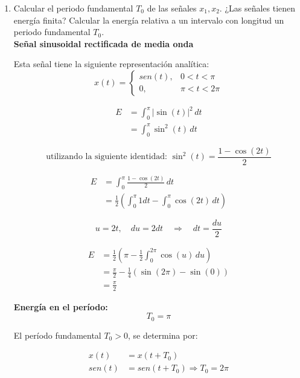 \documentclass[12pt,a4paper]{report}
\begin{document}
\begin{enumerate}[label=\alph*),left=0pt]
  \item Calcular el periodo fundamental $T_0$ de las señales $x_1, x_2$. ¿Las señales tienen energía finita? Calcular
    la energía relativa a un intervalo con longitud un periodo fundamental $T_0$.\\
    \textbf{Señal sinusoidal rectificada de media onda}

    Esta señal tiene la siguiente representación analítica:
    $$x(t)=
    \begin{cases}
      sen(t), & 0<t<\pi\\
      0, & \pi<t<2\pi
    \end{cases}
    $$

    $$
    \begin{aligned}
      E &= \int_{0}^{\pi} |\sin(t)|^2 \, dt \\
        &= \int_{0}^{\pi} \sin^2(t) \, dt
    \end{aligned}
    $$

    $$
    \text{utilizando la siguiente identidad: }
    \sin^2(t) = \frac{1 - \cos(2t)}{2}
    $$

    $$
    \begin{aligned}
      E &= \int_{0}^{\pi} \frac{1 - \cos(2t)}{2} \, dt \\
        &= \frac{1}{2} \left( \int_{0}^{\pi} 1 dt - \int_{0}^{\pi} \cos(2t) \, dt \right)
    \end{aligned}
    $$


    $$u = 2t, \quad du = 2dt \quad \Rightarrow \quad dt = \frac{du}{2}$$

    $$
    \begin{aligned}
       E &= \frac{1}{2} \left( \pi - \frac{1}{2} \int_{0}^{2\pi} \cos(u) \, du \right) \\
         &= \frac{\pi}{2} - \frac{1}{4} \left( \sin(2\pi) - \sin(0) \right) \\
         &= \frac{\pi}{2}
    \end{aligned}
    $$

    \textbf{Energía en el período:}
    $$T_0 = \pi$$

    El período fundamental $T_0>0$, se determina por:

    $$
      \begin{aligned}
      x(t) &= x(t+T_0)\\
      sen(t)&=sen(t+T_0) \Rightarrow T_0=2\pi
      \end{aligned}
    $$


\end{enumerate}
\end{document}
